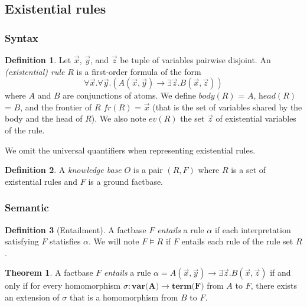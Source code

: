 \documentclass{article}
\theoremstyle{definition}
\newtheorem{definition}{Definition}[section]
\newtheorem{theorem}{Theorem}[section]
\theoremstyle{remark}
\begin{document}
\subsection{Existential rules}

\subsubsection{Syntax}

\begin{definition}
Let $\vec x$, $\vec y$, and $\vec z$ be tuple of variables pairwise disjoint. An \emph{(existential) rule} $R$ is a first-order formula	of the form $$\forall \vec x.\forall \vec y.( A(\vec x,\vec y) \rightarrow \exists \vec z. B(\vec x,\vec z))$$ where $A$ and $B$ are conjunctions of atoms. We define \emph{$\textit{body}(R)$} = $A$, \emph{$\textit{head}(R)$} = $B$, and the frontier of $R$ \emph{$\textit{fr}(R)$} = $\vec x$ (that is the set of variables shared by the body and the head of $R$). We also note \emph{$\textit{ev}(R)$} the set $\vec{z}$ of existential variables of the rule.
\end{definition}
We omit the universal quantifiers when representing existential rules.
\begin{definition}

A \emph{knowledge base} $O$ is a pair $(R,F)$ where $R$ is a set of existential rules and $F$ is a  ground factbase.
\end{definition}


\subsubsection{Semantic}

\begin{definition}[Entailment]
A factbase $F$ \emph{entails} a rule $\alpha$ if each interpretation satisfying $F$ statisfies $\alpha$. We will note $F \models R$ if $F$ entails each rule of the rule set $R$.
\end{definition}

\begin{theorem}
A factbase $F$ \emph{entails} a rule $\alpha = A(\vec x,\vec y) \rightarrow \exists \vec z. B(\vec x,\vec z)$ if and only if for every homomorphism $\sigma: \textbf{var(A)} \to \textbf{term(F)}$ from $A$ to $F$, there exists an extension of $\sigma$ that is a homomorphism from $B$ to $F$.
\end{theorem}
\end{document}
